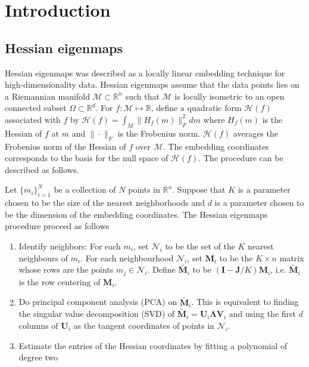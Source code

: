 \chapter{Introduction}
\label{cha:introduction}

\section{Hessian eigenmaps}
\label{sec:hessian-eigenmaps}
Hessian eigenmaps \citet{donoho03:_hesian} was described as a locally
linear embedding technique for high-dimensionality data. Hessian
eigenmaps assume that the data points lies on a  
Riemannian manifold $\mathcal{M} \subset \mathbb{R}^{n}$ such
that $\mathcal{M}$ is locally isometric to an open connected subset
$\Omega \subset \mathbb{R}^{d}$. For $f \colon \mathcal{M} \mapsto
\mathbb{R}$, define a quadratic form $\mathcal{H}(f)$ associated with
$f$ by $\mathcal{H}(f) = \int_{M}{ \| H_f(m) \|_{F}^{2} dm }$ where
$H_f(m)$ is the Hessian of $f$ at $m$ and $\| \cdot \|_F$ is the
Frobenius norm. $\mathcal{H}(f)$ averages the Frobenius norm of the
Hessian of $f$ over $\mathcal{M}$. The embedding coordinates
corresponds to the basis for the null space of $\mathcal{H}(f)$. The
procedure can be described as follows. 

Let $\{m_i\}_{i=1}^{N}$ be a collection of $N$ points in
$\mathbb{R}^{n}$. Suppose that $K$ is a parameter chosen to be the
size of the nearest neighborhoods and $d$ is a parameter chosen to be
the dimension of the embedding coordinates. The Hessian eigenmaps
procedure proceed as follows \citet{donoho03:_hesian}
\begin{enumerate}
\item Identify neighbors: For each $m_i$, set $\mathcal{N}_i$ to be
  the set of the $K$ nearest neighbours of $m_i$. For each
  neighbourhood $\mathcal{N}_i$, set $\mathbf{M}_i$ to be the $K \times n$
  matrix whose rows are the points $m_j \in \mathcal{N}_i$. Define
  $\tilde{\mathbf{M}_i}$ to be $(\mathbf{I} -
  \mathbf{J}/K)\mathbf{M}_i$, i.e. $\tilde{\mathbf{M}_i}$ is
  the row centering of $\mathbf{M}_i$.
\item Do principal component analysis (PCA) on
  $\tilde{\mathbf{M}_i}$. This is equivalent to finding the singular
  value decomposition (SVD) of $\tilde{\mathbf{M}_i} = \mathbf{U}_i
  \bm{\Lambda} \mathbf{V}_i$ and using the first $d$ columns of
  $\mathbf{U}_i$ as the tangent coordinates of points in
  $\mathcal{N}_i$.
\item Estimate the entries of the Hessian coordinates by fitting a
  polynomial of degree two 
\end{enumerate}


